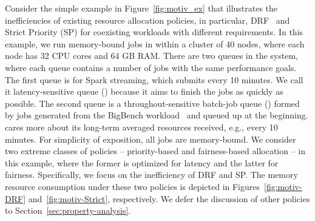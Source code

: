 Consider the simple example in Figure~\ref{fig:motiv_ex} that illustrates the inefficiencies of existing resource allocation policies, in particular, DRF~\cite{drf} and Strict Priority (SP) \cite{strict_priority} for coexisting workloads with different requirements. 
In this example, we run memory-bound jobs in 
within a cluster of 40 nodes, where each node has 32 CPU cores and 64 GB RAM.
% 
There are two queues in the system, where each queue contains a number of jobs with the same performance goals.  
The first queue is for Spark streaming, which submits  every 10 minutes. 
We call it latency-sensitive queue (\burstq) because it aims to finish the jobs as quickly as possible.
The second queue is a throughout-sensitive batch-job queue (\batchq) formed by jobs generated from the BigBench workload~\cite{bbench} and queued up at the beginning. \batchq cares more about its long-term averaged resources received, e.g., every 10 minutes.
For simplicity of exposition, all jobs are memory-bound. 
% 
We consider two extreme classes of policies -- priority-based and fairness-based allocation -- in this example, where the former is optimized for latency and the latter for fairness.
Specifically, we focus on the inefficiency of DRF and SP. 
The memory resource consumption
under these two policies is depicted in Figures~\ref{fig:motiv-DRF} and~\ref{fig:motiv-Strict}, respectively. 
We defer the discussion of other policies to Section~\ref{sec:property-analysis}. 

